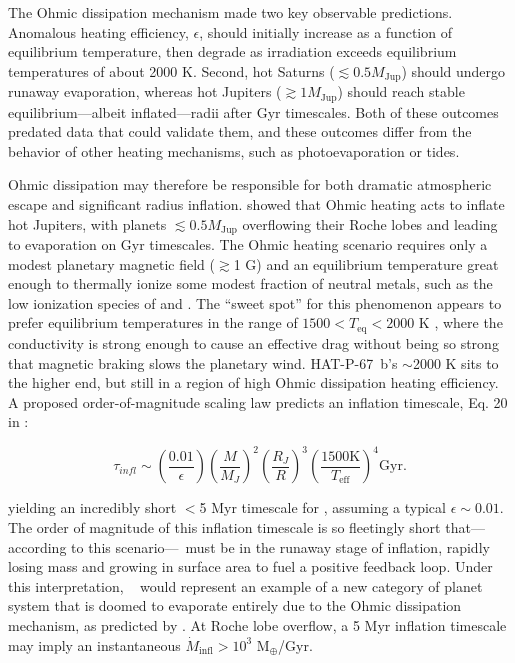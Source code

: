 \documentclass[linenumbers, twocolumn, trackchanges]{aastex631}
\newcommand{\hatpb}{\object{HAT-P-67 b}}
\begin{document}
The Ohmic dissipation mechanism made two key observable predictions.  Anomalous heating efficiency, $\epsilon$, should initially increase as a function of equilibrium temperature, then degrade as irradiation exceeds equilibrium temperatures of about 2000 K.  Second, hot Saturns ($\lesssim0.5 M_\mathrm{Jup}$) should undergo runaway evaporation, whereas hot Jupiters ($\gtrsim 1 M_\mathrm{Jup}$) should reach stable equilibrium---albeit inflated---radii after Gyr timescales.  Both of these outcomes predated data that could validate them, and these outcomes differ from the behavior of other heating mechanisms, such as photoevaporation or tides.

Ohmic dissipation may therefore be responsible for both dramatic atmospheric escape and significant radius inflation.  \citet{2011ApJ...738....1B} showed that Ohmic heating acts to inflate hot Jupiters, with planets $\lesssim 0.5 M_\mathrm{Jup}$ overflowing their Roche lobes and leading to evaporation on Gyr timescales.  The Ohmic heating scenario requires only a modest planetary magnetic field ($\gtrsim$1 G) and an equilibrium temperature great enough to thermally ionize some modest fraction of neutral metals, such as the low ionization species of  and .  The ``sweet spot'' for this phenomenon appears to prefer equilibrium temperatures in the range of $1500<T_\mathrm{eq}<2000$ K \citep{2011ApJ...738....1B,2012ApJ...745..138M,2016ApJ...819..116G,2018AJ....155..214T,2022A&A...658L...7K}, where the conductivity is strong enough to cause an effective drag without being so strong that magnetic braking slows the planetary wind.  HAT-P-67~b's $\sim$2000 K sits to the higher end, but still in a region of high Ohmic dissipation heating efficiency.  A proposed order-of-magnitude scaling law predicts an inflation timescale, Eq. 20 in \citet{2011ApJ...738....1B}:

\begin{equation}
  \tau_{\textit{infl}}\sim \left(\frac{0.01}{\epsilon} \right) \left(\frac{M}{M_{J}}\right)^2 \left(\frac{R_{J}}{R}\right)^3 \left(\frac{1500 \textrm{K}}{T_\mathrm{eff}}\right)^4 \textrm{Gyr}. \label{eqInflate}
\end{equation}


\noindent yielding an incredibly short $<$5 Myr timescale for \hatpb, assuming a typical $\epsilon\sim0.01$.  The order of magnitude of this inflation timescale is so fleetingly short that---according to this scenario---\hatpb~must be in the runaway stage of inflation, rapidly losing mass and growing in surface area to fuel a positive feedback loop.  Under this interpretation, \hatpb~ would represent an example of a new category of planet system that is doomed to evaporate entirely due to the Ohmic dissipation mechanism, as predicted by \citet{2011ApJ...738....1B}.  At Roche lobe overflow, a 5 Myr inflation timescale may imply an instantaneous $\dot{M}_\mathrm{infl}>10^{3}$ M$_\oplus$/Gyr.
\end{document}
